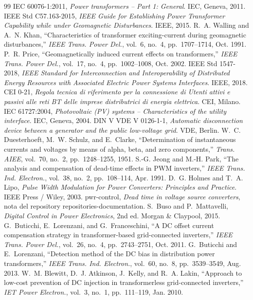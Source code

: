 \documentclass[10pt,a4paper]{scrartcl}
\begin{document}
\begin{thebibliography}{99}
\small
{} IEC 60076-1:2011, \emph{Power transformers -- Part 1: General}. IEC, Geneva, 2011.
 IEEE Std C57.163-2015, \emph{IEEE Guide for Establishing Power Transformer Capability while under Geomagnetic Disturbances}. IEEE, 2015.
 R.~A. Walling and A.~N. Khan, ``Characteristics of transformer exciting-current during geomagnetic disturbances,'' \emph{IEEE Trans. Power Del.}, vol.~6, no.~4, pp.~1707--1714, Oct. 1991.
 P.~R. Price, ``Geomagnetically induced current effects on transformers,'' \emph{IEEE Trans. Power Del.}, vol.~17, no.~4, pp.~1002--1008, Oct. 2002.
 IEEE Std 1547-2018, \emph{IEEE Standard for Interconnection and Interoperability of Distributed Energy Resources with Associated Electric Power Systems Interfaces}. IEEE, 2018.
 CEI 0-21, \emph{Regola tecnica di riferimento per la connessione di Utenti attivi e passivi alle reti BT delle imprese distributrici di energia elettrica}. CEI, Milano.
 IEC 61727:2004, \emph{Photovoltaic (PV) systems -- Characteristics of the utility interface}. IEC, Geneva, 2004.
 DIN V VDE V 0126-1-1, \emph{Automatic disconnection device between a generator and the public low-voltage grid}. VDE, Berlin.
 W.~C. Duesterhoeft, M.~W. Schulz, and E.~Clarke, ``Determination of instantaneous currents and voltages by means of alpha, beta, and zero components,'' \emph{Trans. AIEE}, vol.~70, no.~2, pp.~1248--1255, 1951.
 S.-G. Jeong and M.-H. Park, ``The analysis and compensation of dead-time effects in PWM inverters,'' \emph{IEEE Trans. Ind. Electron.}, vol.~38, no.~2, pp.~108--114, Apr. 1991.
 D.~G. Holmes and T.~A. Lipo, \emph{Pulse Width Modulation for Power Converters: Principles and Practice}. IEEE Press / Wiley, 2003.
 pwr-control, \emph{Dead time in voltage source converters}, nota  del repository repositories-documentation.
 S.~Buso and P.~Mattavelli, \emph{Digital Control in Power Electronics}, 2nd ed. Morgan \& Claypool, 2015.
 G.~Buticchi, E.~Lorenzani, and G.~Franceschini, ``A DC offset current compensation strategy in transformer-based grid-connected inverters,'' \emph{IEEE Trans. Power Del.}, vol.~26, no.~4, pp.~2743--2751, Oct. 2011.
 G.~Buticchi and E.~Lorenzani, ``Detection method of the DC bias in distribution power transformers,'' \emph{IEEE Trans. Ind. Electron.}, vol.~60, no.~8, pp.~3539--3549, Aug. 2013.
 W.~M. Blewitt, D.~J. Atkinson, J.~Kelly, and R.~A. Lakin, ``Approach to low-cost prevention of DC injection in transformerless grid-connected inverters,'' \emph{IET Power Electron.}, vol.~3, no.~1, pp.~111--119, Jan. 2010.
\end{thebibliography}
\end{document}
